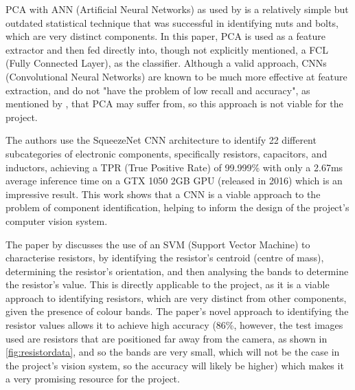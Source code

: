 PCA with ANN (Artificial Neural Networks) as used by \citet{Dhenge2013MechanicalNS} is a relatively simple but outdated statistical technique that was successful in identifying nuts and bolts, which are very distinct components. 
In this paper, PCA is used as a feature extractor and then fed directly into, though not explicitly mentioned, a FCL (Fully Connected Layer), as the classifier. Although a valid approach, CNNs (Convolutional Neural Networks) are known to be much more
effective at feature extraction, and do not "have the problem of low recall and accuracy", as mentioned by \citet{Xu2020}, that PCA may suffer from, so this approach is not viable for the project. 

The authors \citet{Xu2020} use the SqueezeNet CNN architecture to identify 22 different subcategories of electronic components, specifically resistors, capacitors, and inductors, achieving a TPR (True Positive Rate) of 99.999\% with only a 2.67ms average inference time on a 
GTX 1050 2GB GPU (released in 2016) which is an impressive result. This work shows that a CNN is a viable approach to the problem of component identification, helping to inform the design of the project's computer vision system.

The paper by \citet{8939034} discusses the use of an SVM (Support Vector Machine) to characterise resistors, by identifying the resistor's centroid (centre of mass), determining the resistor's orientation, and then analysing the bands to determine the resistor's value.
This is directly applicable to the project, as it is a viable approach to identifying resistors, which are very distinct from other components, given the presence of colour bands. The paper's novel approach to identifying the resistor values allows it to achieve high accuracy (86\%, however,
the test images used are resistors that are positioned far away from the camera, as shown in  \autoref{fig:resistordata}, and so the bands are very small, which will not be the case in the project's vision system, so the accuracy will likely be higher) which makes it a very promising resource for the project.


